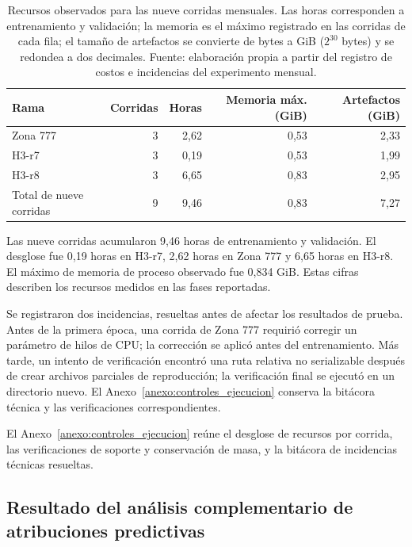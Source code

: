 \begin{table}[htbp]
\centering
\small
\caption{Recursos observados para las nueve corridas mensuales. Las horas corresponden a entrenamiento y validación; la memoria es el máximo registrado en las corridas de cada fila; el tamaño de artefactos se convierte de bytes a GiB ($2^{30}$ bytes) y se redondea a dos decimales. Fuente: elaboración propia a partir del registro de costos e incidencias del experimento mensual.}
\label{tab:costos_ejecucion}
\begin{tabular*}{\textwidth}{@{\extracolsep{\fill}}lrrrr@{}}
\toprule
\textbf{Rama} & \textbf{Corridas} & \textbf{Horas} & \textbf{Memoria máx. (GiB)} & \textbf{Artefactos (GiB)} \\
\midrule
Zona 777 & 3 & 2,62 & 0,53 & 2,33 \\
H3-r7 & 3 & 0,19 & 0,53 & 1,99 \\
H3-r8 & 3 & 6,65 & 0,83 & 2,95 \\
\midrule
Total de nueve corridas & 9 & 9,46 & 0,83 & 7,27 \\
\bottomrule
\end{tabular*}
\end{table}

Las nueve corridas acumularon 9,46 horas de entrenamiento y validación. El desglose fue 0,19 horas en H3-r7, 2,62 horas en Zona 777 y 6,65 horas en H3-r8. El máximo de memoria de proceso observado fue 0,834 GiB. Estas cifras describen los recursos medidos en las fases reportadas.

Se registraron dos incidencias, resueltas antes de afectar los resultados de prueba. Antes de la primera época, una corrida de Zona 777 requirió corregir un parámetro de hilos de CPU; la corrección se aplicó antes del entrenamiento. Más tarde, un intento de verificación encontró una ruta relativa no serializable después de crear archivos parciales de reproducción; la verificación final se ejecutó en un directorio nuevo. El Anexo~\ref{anexo:controles_ejecucion} conserva la bitácora técnica y las verificaciones correspondientes.

El Anexo~\ref{anexo:controles_ejecucion} reúne el desglose de recursos por corrida, las verificaciones de soporte y conservación de masa, y la bitácora de incidencias técnicas resueltas.

\subsection{Resultado del análisis complementario de atribuciones predictivas}
\label{sec:resultado_xai}

